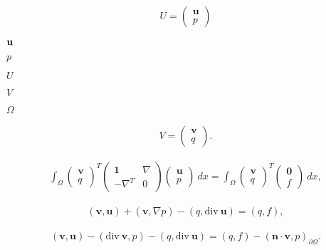 \documentclass{article}
\begin{document}
\begin{eqnarray*} U = \left( \begin{array}{c} \mathbf u \\ p \end{array} \right) \end{eqnarray*}
\pagebreak

$\textbf u$
\pagebreak

$p$
\pagebreak

$U$
\pagebreak

$V$
\pagebreak

$\Omega$
\pagebreak

\begin{eqnarray*} V = \left( \begin{array}{c} \mathbf v \\ q \end{array} \right). \end{eqnarray*}
\pagebreak

\begin{eqnarray*} \int_\Omega \left( \begin{array}{c} \mathbf v \\ q \end{array} \right)^T \left( \begin{array}{cc} \mathbf 1 & \nabla \\ -\nabla^T & 0 \end{array} \right) \left( \begin{array}{c} \mathbf u \\ p \end{array} \right) \ dx = \int_\Omega \left( \begin{array}{c} \mathbf v \\ q \end{array} \right)^T \left( \begin{array}{c} \mathbf 0 \\ f \end{array} \right) \ dx, \end{eqnarray*}
\pagebreak

\begin{eqnarray*} (\mathbf v, \mathbf u) + (\mathbf v, \nabla p) - (q, \mathrm{div}\ \mathbf u) = (q,f), \end{eqnarray*}
\pagebreak

\begin{eqnarray*} (\mathbf v, \mathbf u) - (\mathrm{div}\ \mathbf v, p) - (q, \mathrm{div}\ \mathbf u) = (q,f) - (\mathbf n\cdot\mathbf v, p)_{\partial\Omega}. \end{eqnarray*}
\pagebreak
\end{document}
